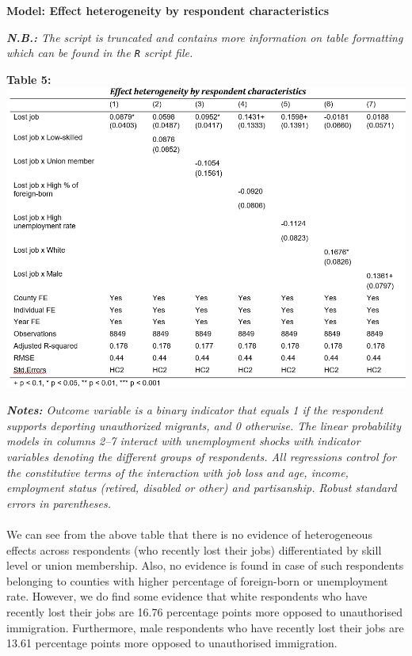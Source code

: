 \documentclass[12pt,letterpaper]{article}
\begin{document}
\textbf{Model: Effect heterogeneity by respondent characteristics}

\textit{\textbf{N.B.:} The script is truncated and contains more information on table formatting which can be found in the \texttt{R} script file.}
\pagebreak
\begin{center}
	\textbf{Table 5:}
	\includegraphics{Heterogeneity.png} 
\end{center}
\textit{\textbf{Notes:} Outcome variable is a binary indicator that equals 1 if the respondent supports deporting unauthorized migrants, and 0 otherwise. The linear probability models in columns 2–7 interact with unemployment shocks with indicator variables denoting the different groups of respondents. All regressions control for the constitutive terms of the interaction with job loss and age, income, employment status (retired, disabled or other) and partisanship. Robust standard errors in parentheses.}\\
\\We can see from the above table that there is no evidence of heterogeneous effects across respondents (who recently lost their jobs) differentiated by skill level or union membership. Also, no evidence is found in case of such respondents belonging to counties with higher percentage of foreign-born or unemployment rate. However, we do find some evidence that white respondents who have recently lost their jobs are 16.76 percentage points more opposed to unauthorised immigration. Furthermore, male respondents who have recently lost their jobs are 13.61 percentage points more opposed to unauthorised immigration. 
\end{document}
